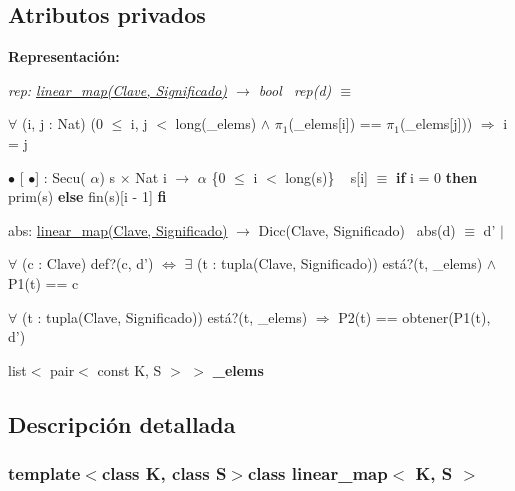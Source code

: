 \subsection*{Atributos privados}
\begin{Indent}{\bf Representación\+:}\par
{\em rep\+: \hyperlink{classlinear__map}{linear\+\_\+map(\+Clave, Significado)} $\to$ bool~\newline
rep(d) $\equiv$
\begin{DoxyItemize}
\item $\forall$ (i, j \+: Nat) (0 $\leq$ i, j $<$ long(\+\_\+elems) $\land$ $\pi_1$(\+\_\+elems\mbox{[}i\mbox{]}) == $\pi_1$(\+\_\+elems\mbox{[}j\mbox{]})) $\Rightarrow$ i = j
\end{DoxyItemize}

$\bullet$ \mbox{[} $\bullet$\mbox{]} \+: Secu( $\alpha$) s $\times$ Nat i $\rightarrow$ $\alpha$ \{0 $\leq$ i $<$ long(s)\} ~\newline
s\mbox{[}i\mbox{]} $\equiv$ {\bfseries if} i = 0 {\bfseries then} prim(s) {\bfseries else} fin(s)\mbox{[}i -\/ 1\mbox{]} {\bfseries fi} 

abs\+: \hyperlink{classlinear__map}{linear\+\_\+map(\+Clave, Significado)} $\to$ Dicc(\+Clave, Significado)~\newline
abs(d) $\equiv$ d' $|$
\begin{DoxyItemize}
\item $\forall$ (c \+: Clave) def?(c, d') $\Leftrightarrow$ $\exists$ (t \+: tupla(\+Clave, Significado)) está?(t, \+\_\+elems) $\land$ P1(t) == c
\item $\forall$ (t \+: tupla(\+Clave, Significado)) está?(t, \+\_\+elems) $\Rightarrow$ P2(t) == obtener(P1(t), d') 
\end{DoxyItemize}}\begin{DoxyCompactItemize}
\item 
\hypertarget{classlinear__map_aeb6846d41a9b28c5511b1ece965efe61}{list$<$ pair$<$ const K, S $>$ $>$ {\bfseries \+\_\+elems}}\label{classlinear__map_aeb6846d41a9b28c5511b1ece965efe61}

\end{DoxyCompactItemize}
\end{Indent}


\subsection{Descripción detallada}
\subsubsection*{template$<$class K, class S$>$class linear\+\_\+map$<$ K, S $>$}

